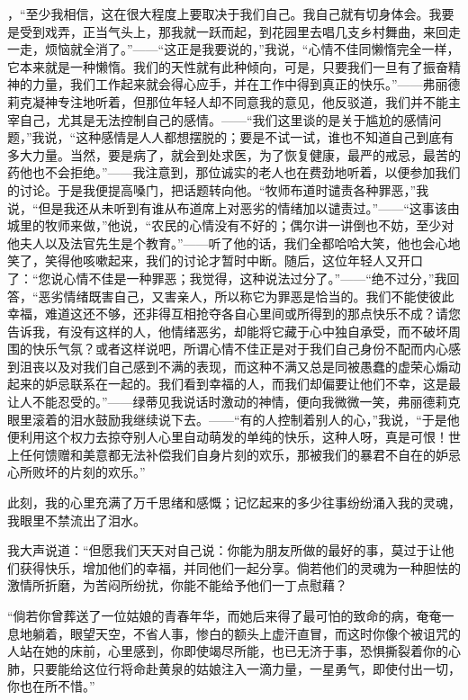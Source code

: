 \documentclass[12pt,oneside]{book}
\begin{document}
，“至少我相信，这在很大程度上要取决于我们自己。我自己就有切身体会。我要是受到戏弄，正当气头上，那我就一跃而起，到花园里去唱几支乡村舞曲，来回走一走，烦恼就全消了。”——“这正是我要说的，”我说，“心情不佳同懒惰完全一样，它本来就是一种懒惰。我们的天性就有此种倾向，可是，只要我们一旦有了振奋精神的力量，我们工作起来就会得心应手，并在工作中得到真正的快乐。”——弗丽德莉克凝神专注地听着，但那位年轻人却不同意我的意见，他反驳道，我们并不能主宰自己，尤其是无法控制自己的感情。——“我们这里谈的是关于尴尬的感情问题，”我说，“这种感情是人人都想摆脱的；要是不试一试，谁也不知道自己到底有多大力量。当然，要是病了，就会到处求医，为了恢复健康，最严的戒忌，最苦的药他也不会拒绝。”——我注意到，那位诚实的老人也在费劲地听着，以便参加我们的讨论。于是我便提高嗓门，把话题转向他。“牧师布道时谴责各种罪恶，”我说，“但是我还从未听到有谁从布道席上对恶劣的情绪加以谴责过。”——“这事该由城里的牧师来做，”他说，“农民的心情没有不好的；偶尔讲一讲倒也不妨，至少对他夫人以及法官先生是个教育。”——听了他的话，我们全都哈哈大笑，他也会心地笑了，笑得他咳嗽起来，我们的讨论才暂时中断。随后，这位年轻人又开口了：“您说心情不佳是一种罪恶；我觉得，这种说法过分了。”——“绝不过分，”我回答，“恶劣情绪既害自己，又害亲人，所以称它为罪恶是恰当的。我们不能使彼此幸福，难道这还不够，还非得互相抢夺各自心里间或所得到的那点快乐不成？请您告诉我，有没有这样的人，他情绪恶劣，却能将它藏于心中独自承受，而不破坏周围的快乐气氛？或者这样说吧，所谓心情不佳正是对于我们自己身份不配而内心感到沮丧以及对我们自己感到不满的表现，而这种不满又总是同被愚蠢的虚荣心煽动起来的妒忌联系在一起的。我们看到幸福的人，而我们却偏要让他们不幸，这是最让人不能忍受的。”——绿蒂见我说话时激动的神情，便向我微微一笑，弗丽德莉克眼里滚着的泪水鼓励我继续说下去。——“有的人控制着别人的心，”我说，“于是他便利用这个权力去掠夺别人心里自动萌发的单纯的快乐，这种人呀，真是可恨！世上任何馈赠和美意都无法补偿我们自身片刻的欢乐，那被我们的暴君不自在的妒忌心所败坏的片刻的欢乐。”

此刻，我的心里充满了万千思绪和感慨；记忆起来的多少往事纷纷涌入我的灵魂，我眼里不禁流出了泪水。

我大声说道：“但愿我们天天对自己说：你能为朋友所做的最好的事，莫过于让他们获得快乐，增加他们的幸福，并同他们一起分享。倘若他们的灵魂为一种胆怯的激情所折磨，为苦闷所纷扰，你能不能给予他们一丁点慰藉？

“倘若你曾葬送了一位姑娘的青春年华，而她后来得了最可怕的致命的病，奄奄一息地躺着，眼望天空，不省人事，惨白的额头上虚汗直冒，而这时你像个被诅咒的人站在她的床前，心里感到，你即使竭尽所能，也已无济于事，恐惧撕裂着你的心肺，只要能给这位行将命赴黄泉的姑娘注入一滴力量，一星勇气，即使付出一切，你也在所不惜。”
\end{document}
